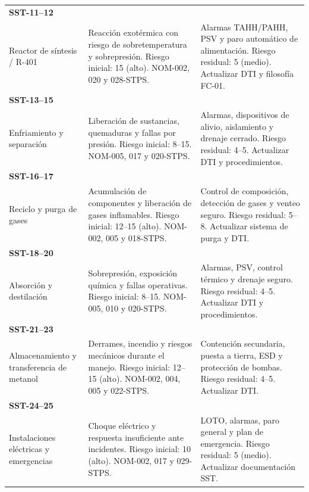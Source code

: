 \documentclass[11pt,letterpaper]{article}
\begin{document}
\begin{tabularx}{\linewidth}{@{}Y Y Y@{}}
\textbf{SST-11--12}\\
Reactor de síntesis / R-401
&
Reacción exotérmica con riesgo de
sobretemperatura y sobrepresión.
Riesgo inicial: 15 (alto).
NOM-002, 020 y 028-STPS.
&
Alarmas TAHH/PAHH, PSV y paro
automático de alimentación.
Riesgo residual: 5 (medio).
Actualizar DTI y filosofía FC-01.
\\

\textbf{SST-13--15}\\
Enfriamiento y separación
&
Liberación de sustancias, quemaduras
y fallas por presión.
Riesgo inicial: 8--15.
NOM-005, 017 y 020-STPS.
&
Alarmas, dispositivos de alivio,
aislamiento y drenaje cerrado.
Riesgo residual: 4--5.
Actualizar DTI y procedimientos.
\\

\textbf{SST-16--17}\\
Reciclo y purga de gases
&
Acumulación de componentes y
liberación de gases inflamables.
Riesgo inicial: 12--15 (alto).
NOM-002, 005 y 018-STPS.
&
Control de composición, detección
de gases y venteo seguro.
Riesgo residual: 5--8.
Actualizar sistema de purga y DTI.
\\

\textbf{SST-18--20}\\
Absorción y destilación
&
Sobrepresión, exposición química
y fallas operativas.
Riesgo inicial: 8--15.
NOM-005, 010 y 020-STPS.
&
Alarmas, PSV, control térmico
y drenaje seguro.
Riesgo residual: 4--5.
Actualizar DTI y procedimientos.
\\

\textbf{SST-21--23}\\
Almacenamiento y transferencia
de metanol
&
Derrames, incendio y riesgos
mecánicos durante el manejo.
Riesgo inicial: 12--15 (alto).
NOM-002, 004, 005 y 022-STPS.
&
Contención secundaria, puesta
a tierra, ESD y protección
de bombas. Riesgo residual: 4--5.
Actualizar DTI.
\\

\textbf{SST-24--25}\\
Instalaciones eléctricas
y emergencias
&
Choque eléctrico y respuesta
insuficiente ante incidentes.
Riesgo inicial: 10 (alto).
NOM-002, 017 y 029-STPS.
&
LOTO, alarmas, paro general
y plan de emergencia.
Riesgo residual: 5 (medio).
Actualizar documentación SST.
\\

\bottomrule
\end{tabularx}
\end{document}
